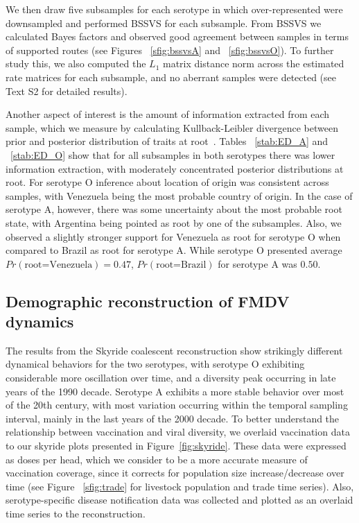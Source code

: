 \documentclass[10pt]{article}
\begin{document}
We then draw five subsamples for each serotype in which over-represented were downsampled and performed BSSVS for each subsample.
From BSSVS we calculated Bayes factors and observed good agreement between samples in terms of supported routes (see Figures ~\ref{sfig:bssvsA} and ~\ref{sfig:bssvsO}).
To further study this, we also computed the $L_1$ matrix distance norm across the estimated rate matrices for each subsample, and no aberrant samples were detected (see Text S2 for detailed results).

Another aspect of interest is the amount of information extracted from each sample, which we measure by calculating Kullback-Leibler divergence between prior and posterior distribution of traits at root~\cite{roots}.
Tables ~\ref{stab:ED_A} and ~\ref{stab:ED_O} show that for all subsamples in both serotypes there was lower information extraction, with moderately concentrated posterior distributions at root.
For serotype O inference about location of origin was consistent across samples, with Venezuela being the most probable country of origin.
In the case of serotype A, however, there was some uncertainty about the most probable root state, with Argentina being pointed as root by one of the subsamples.
Also, we observed a slightly stronger support for Venezuela as root for serotype O when compared to Brazil as root for serotype A.
While serotype O presented average $Pr(\text{root=Venezuela})=0.47$, $Pr(\text{root=Brazil})$ for serotype A was $0.50$.

\subsection*{Demographic reconstruction of FMDV dynamics}

The results from the Skyride coalescent reconstruction show strikingly different dynamical behaviors for the two serotypes, with serotype O exhibiting considerable more oscillation over time, and a diversity peak occurring in late years of the 1990 decade.
Serotype A exhibits a more stable behavior over most of the 20th century, with most variation occurring within the temporal sampling interval, mainly in the last years of the 2000 decade.
To better understand the relationship between vaccination and viral diversity, we overlaid vaccination data to our skyride plots presented in Figure~\ref{fig:skyride}.
These data were expressed as doses per head, which we consider to be a more accurate measure of vaccination coverage, since it corrects for population size increase/decrease over time (see Figure ~\ref{sfig:trade} for livestock population and trade time series). 
Also, serotype-specific disease notification data was collected and plotted as an overlaid time series to the reconstruction. 
\end{document}
